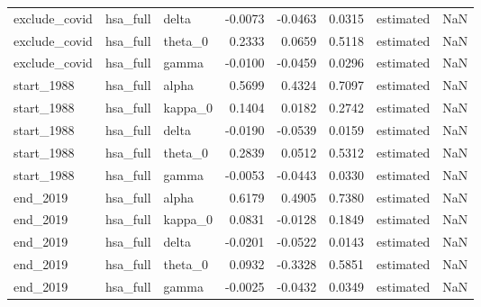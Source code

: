 \begin{tabular}{lllrrrlr}
exclude\_covid & hsa\_full & delta & -0.0073 & -0.0463 & 0.0315 & estimated & NaN \\
exclude\_covid & hsa\_full & theta\_0 & 0.2333 & 0.0659 & 0.5118 & estimated & NaN \\
exclude\_covid & hsa\_full & gamma & -0.0100 & -0.0459 & 0.0296 & estimated & NaN \\
start\_1988 & hsa\_full & alpha & 0.5699 & 0.4324 & 0.7097 & estimated & NaN \\
start\_1988 & hsa\_full & kappa\_0 & 0.1404 & 0.0182 & 0.2742 & estimated & NaN \\
start\_1988 & hsa\_full & delta & -0.0190 & -0.0539 & 0.0159 & estimated & NaN \\
start\_1988 & hsa\_full & theta\_0 & 0.2839 & 0.0512 & 0.5312 & estimated & NaN \\
start\_1988 & hsa\_full & gamma & -0.0053 & -0.0443 & 0.0330 & estimated & NaN \\
end\_2019 & hsa\_full & alpha & 0.6179 & 0.4905 & 0.7380 & estimated & NaN \\
end\_2019 & hsa\_full & kappa\_0 & 0.0831 & -0.0128 & 0.1849 & estimated & NaN \\
end\_2019 & hsa\_full & delta & -0.0201 & -0.0522 & 0.0143 & estimated & NaN \\
end\_2019 & hsa\_full & theta\_0 & 0.0932 & -0.3328 & 0.5851 & estimated & NaN \\
end\_2019 & hsa\_full & gamma & -0.0025 & -0.0432 & 0.0349 & estimated & NaN \\
\bottomrule
\end{tabular}

